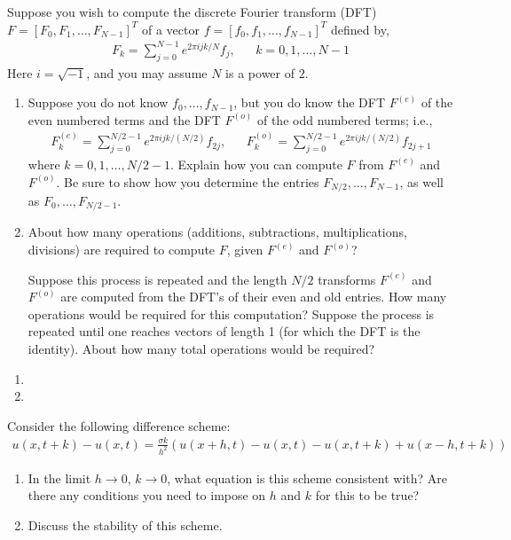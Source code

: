 \documentclass[10pt]{article}
\begin{document}
\begin{problem}
Suppose you wish to compute the discrete Fourier transform (DFT) \( F = [F_0,F_1, \ldots, F_{N-1}]^T \) of a vector \( f = [f_0,f_1, \ldots, f_{N-1}]^T \) defined by,
\begin{align*}
    F_k = \sum_{j=0}^{N-1} e^{2\pi i j k/N} f_j, && k=0,1,\ldots, N-1
\end{align*}
Here \( i = \sqrt{-1} \), and you may assume \( N \) is a power of \( 2 \).
\begin{enumerate}[nolistsep,label=(\alph*)]
    \item Suppose you do not know \( f_0, \ldots, f_{N-1} \), but you do know the DFT \( F^{(e)} \) of the even numbered terms and the DFT \( F^{(o)} \) of the odd numbered terms; i.e.,
        \begin{align*}
            F_k^{(e)} = \sum_{j=0}^{N/2-1}e^{2\pi i j k/(N/2)} f_{2j}, && F_k^{(o)} = \sum_{j=0}^{N/2-1}e^{2\pi i j k/(N/2)} f_{2j+1}
        \end{align*}
        where \( k=0,1,\ldots,N/2-1 \). Explain how you can compute \( F \) from \( F^{(e)} \) and \( F^{(o)} \). Be sure to show how you determine the entries \( F_{N/2}, \ldots, F_{N-1} \), as well as \( F_0, \ldots, F_{N/2-1} \).
    \item About how many operations (additions, subtractions, multiplications, divisions) are required to compute \( F \), given \( F^{(e)} \) and \( F^{(o)}\)?
        
        Suppose this process is repeated and the length \( N/2 \) transforms \( F^{(e)} \) and \( F^{(o)} \) are computed from the DFT’s of their even and old entries. How many operations would be required for this computation? Suppose the process is repeated until one reaches vectors
of length 1 (for which the DFT is the identity). About how many total operations would be required?
\end{enumerate}
\end{problem}

\begin{solution}[Solution]
    \begin{enumerate}[label=(\alph*)]
    \item
    \item 
\end{enumerate}    
\end{solution}


\begin{problem}
Consider the following difference scheme:
\begin{align*}
    u(x,t+k)- u(x,t) = \frac{\sigma k}{h^2} (u(x+h,t)-u(x,t)-u(x,t+k)+u(x-h,t+k))
\end{align*}
\begin{enumerate}[nolistsep,label=(\alph*)]
    \item In the limit \( h\to0 \), \( k\to 0 \), what equation is this scheme consistent with? Are there any conditions you need to impose on \( h \) and \( k \) for this to be true?
    \item Discuss the stability of this scheme.
\end{enumerate}
\end{problem}
\end{document}
